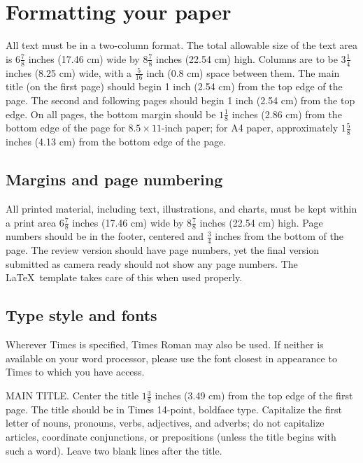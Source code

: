 \documentclass[10pt,twocolumn,letterpaper]{article}
\begin{document}
\section{Formatting your paper}
\label{sec:formatting}

All text must be in a two-column format.
The total allowable size of the text area is $6\frac78$ inches (17.46 cm) wide by $8\frac78$ inches (22.54 cm) high.
Columns are to be $3\frac14$ inches (8.25 cm) wide, with a $\frac{5}{16}$ inch (0.8 cm) space between them.
The main title (on the first page) should begin 1 inch (2.54 cm) from the top edge of the page.
The second and following pages should begin 1 inch (2.54 cm) from the top edge.
On all pages, the bottom margin should be $1\frac{1}{8}$ inches (2.86 cm) from the bottom edge of the page for $8.5 \times 11$-inch paper;
for A4 paper, approximately $1\frac{5}{8}$ inches (4.13 cm) from the bottom edge of the
page.

\subsection{Margins and page numbering}

All printed material, including text, illustrations, and charts, must be kept
within a print area $6\frac{7}{8}$ inches (17.46 cm) wide by $8\frac{7}{8}$ inches (22.54 cm)
high.
%
Page numbers should be in the footer, centered and $\frac{3}{4}$ inches from the bottom of the page.
The review version should have page numbers, yet the final version submitted as camera ready should not show any page numbers.
The \LaTeX\ template takes care of this when used properly.



\subsection{Type style and fonts}

Wherever Times is specified, Times Roman may also be used.
If neither is available on your word processor, please use the font closest in
appearance to Times to which you have access.

MAIN TITLE.
Center the title $1\frac{3}{8}$ inches (3.49 cm) from the top edge of the first page.
The title should be in Times 14-point, boldface type.
Capitalize the first letter of nouns, pronouns, verbs, adjectives, and adverbs;
do not capitalize articles, coordinate conjunctions, or prepositions (unless the title begins with such a word).
Leave two blank lines after the title.
\end{document}
